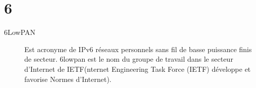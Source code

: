 \section{6}

\begin{description}

\item [6LowPAN]Est acronyme de IPv6 réseaux personnels sans fil de basse puissance finis de secteur. 6lowpan est le nom du groupe de travail dans le secteur d'Internet de IETF(nternet Engineering Task Force (IETF) développe et favorise Normes d'Internet).

\end{description}